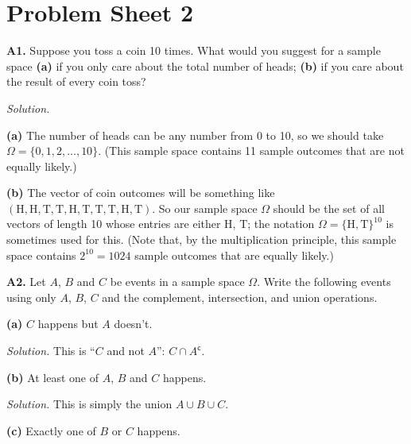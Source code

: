 \documentclass[
  a4paper,
]{book}
\theoremstyle{definition}
\theoremstyle{definition}
\theoremstyle{definition}
\theoremstyle{definition}
\theoremstyle{remark}
\begin{document}
\hypertarget{P2-solutions}{%
\section*{Problem Sheet 2}\label{P2-solutions}}

\textbf{A1.} Suppose you toss a coin 10 times. What would you suggest for a sample space \textbf{(a)} if you only care about the total number of heads; \textbf{(b)} if you care about the result of every coin toss?

\begin{myanswers}
\emph{Solution.}

\textbf{(a)} The number of heads can be any number from 0 to 10, so we should take \(\Omega = \{0,1,2,\dots, 10\}\). (This sample space contains 11 sample outcomes that are not equally likely.)

\textbf{(b)} The vector of coin outcomes will be something like \((\text{H}, \text{H}, \text{T}, \text{T}, \text{H}, \text{T}, \text{T}, \text{T}, \text{H}, \text{T})\). So our sample space \(\Omega\) should be the set of all vectors of length 10 whose entries are either H, T; the notation \(\Omega = \{\text{H}, \text{T}\}^{10}\) is sometimes used for this. (Note that, by the multiplication principle, this sample space contains \(2^{10} = 1024\) sample outcomes that are equally likely.)

\end{myanswers}

\textbf{A2.} Let \(A\), \(B\) and \(C\) be events in a sample space \(\Omega\). Write the following events using only \(A\), \(B\), \(C\) and the complement, intersection, and union operations.

\textbf{(a)} \(C\) happens but \(A\) doesn't.

\begin{myanswers}
\emph{Solution.} This is ``\(C\) and not \(A\)'': \(C\cap A^{\mathsf{c}}\).

\end{myanswers}

\textbf{(b)} At least one of \(A\), \(B\) and \(C\) happens.

\begin{myanswers}
\emph{Solution.} This is simply the union \(A \cup B\cup C\).

\end{myanswers}

\textbf{(c)} Exactly one of \(B\) or \(C\) happens.
\end{document}
